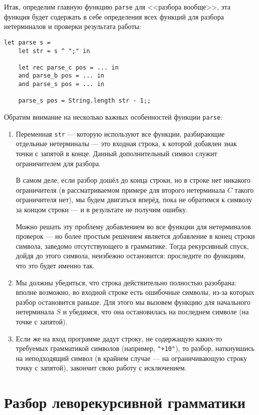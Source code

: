 \documentclass[12pt]{article}
\begin{document}
Итак, определим главную функцию \verb!parse! для <<разбора вообще>>, эта функция будет содержать 
в себе определения всех функций для разбора нетерминалов и проверки результата работы:

\begin{verbatim}
let parse s =
    let str = s ^ ";" in

    let rec parse_c pos = ... in
    and parse_b pos = ... in
    and parse_s pos = ... in

    parse_s pos = String.length str - 1;;
\end{verbatim}

Обратим внимание на несколько важных особенностей функции \verb!parse!:
\begin{enumerate}
\item Переменная \verb!str! --- которую используют все функции, разбирающие
отдельные нетерминалы --- это входная строка, к которой добавлен знак точки с
запятой в конце. Данный дополнительный символ служит ограничителем для разбора.

В самом деле, если разбор дошёл до конца строки, но в строке нет никакого ограничителя
(в рассматриваемом примере для второго нетерминала $C$ такого ограничителя нет), 
мы будем двигаться вперёд, пока не обратимся к символу за концом строки --- 
и в результате не получим ошибку.

Можно решать эту проблему добавлением во все функции для нетерминалов проверок 
--- но более простым решением является добавление в конец строки символа, заведомо
отсутствующего в грамматике. Тогда рекурсивный спуск, дойдя до этого символа,
неизбежно остановится: проследите по функциям, что это будет именно так.

\item Мы должны убедиться, что строка действительно полностью разобрана: вполне
возможно, во входной строке есть ошибочные символы, из-за которых разбор остановится
раньше. Для этого мы вызовем функцию для начального нетерминала $S$ и убедимся, что
она остановилась на последнем символе (на точке с запятой). 

\item Если же на вход программе дадут строку, не содержащую каких-то требуемых
грамматикой символов (например, \verb!"+10"!), то разбор, наткнувшись на неподходящий
символ (в крайнем случае --- на ограничивающую строку точку с запятой), закончит
свою работу с исключением.
\end{enumerate}

\section{Разбор леворекурсивной грамматики}
\end{document}
